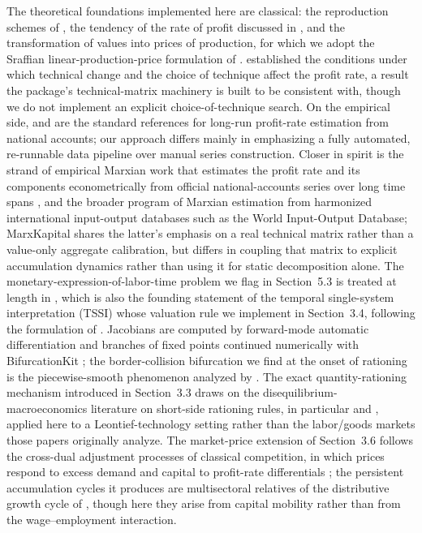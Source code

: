 \documentclass[11pt]{article}
\begin{document}
The theoretical foundations implemented here are classical: the
reproduction schemes of \citet{marx1976capital1}, the tendency of the rate
of profit discussed in \citet{marx1981capital3}, and the transformation of
values into prices of production, for which we adopt the Sraffian
linear-production-price formulation of \citet{sraffa1960production}.
\citet{okishio1961technical} established the conditions under which
technical change and the choice of technique affect the profit rate, a
result the package's technical-matrix machinery is built to be consistent
with, though we do not implement an explicit choice-of-technique search.
On the empirical side, \citet{shaikh2016capitalism} and
\citet{dumenil1993economics} are the standard references for long-run
profit-rate estimation from national accounts; our approach differs mainly
in emphasizing a fully automated, re-runnable data pipeline over manual
series construction. Closer in spirit is the strand of empirical Marxian
work that estimates the profit rate and its components econometrically
from official national-accounts series over long time spans
\citep{basu2013reserve}, and the broader program of Marxian estimation
from harmonized international input-output databases such as the World
Input-Output Database; MarxKapital shares the latter's emphasis on a
real technical matrix rather than a value-only aggregate calibration,
but differs in coupling that matrix to explicit accumulation dynamics
rather than using it for static decomposition alone. The monetary-expression-of-labor-time
problem we flag in Section~5.3 is treated at length in
\citet{freeman1996marx}, which is also the founding statement of the
temporal single-system interpretation (TSSI) whose valuation rule we
implement in Section~3.4, following the formulation of
\citet{kliman1999temporal}. Jacobians are computed by forward-mode
automatic differentiation \citep{revels2016forward} and branches of fixed
points continued numerically with BifurcationKit \citep{veltz2020bifurcationkit};
the border-collision bifurcation we find at the onset of rationing is
the piecewise-smooth phenomenon analyzed by \citet{nusse1992border}. The exact quantity-rationing mechanism introduced in
Section~3.3 draws on the disequilibrium-macroeconomics literature on
short-side rationing rules, in particular \citet{barro1971general} and
\citet{benassy1975neokeynesian}, applied here to a Leontief-technology
setting rather than the labor/goods markets those papers originally
analyze. The market-price extension of Section~3.6 follows the
cross-dual adjustment processes of classical competition, in which
prices respond to excess demand and capital to profit-rate
differentials \citep{flaschel1987classical,flaschel1997dynamic}; the
persistent accumulation cycles it produces are multisectoral relatives
of the distributive growth cycle of \citet{goodwin1967growth}, though
here they arise from capital mobility rather than from the
wage--employment interaction.
\end{document}
